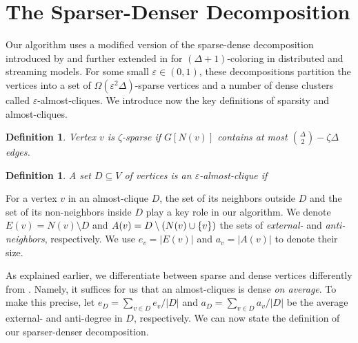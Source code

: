 \documentclass[a4paper,english,11pt]{amsart}
\newtheorem{definition}[lemma]{Definition}
\theoremstyle{definition}
\renewcommand{\leq}{\leqslant}
\renewcommand{\geq}{\geqslant}
\DeclarePairedDelimiter{\set}{\{}{\}}
\newcommand{\eps}{\varepsilon}
\begin{document}
\section{The Sparser-Denser Decomposition}
\label{sec:prelims}

\label{sec:prelims-acd}
Our algorithm uses a modified version of the sparse-dense decomposition introduced by \cite{Reed98} and further extended in \cite{HSS18,ACK19} for $(\Delta+1)$-coloring in distributed and streaming models. For some small $\eps\in(0,1)$, these decompositions partition the vertices into a set of $\Omega(\eps^2 \Delta)$-sparse vertices and a number of dense clusters called $\eps$-almost-cliques.
We introduce now the key definitions of sparsity and almost-cliques.
\begin{definition}
    \label{def:sparsity}
    Vertex $v$ is $\zeta$-sparse if $G[N(v)]$ contains at most $\binom{\Delta}{2} - \zeta\Delta$ edges.
\end{definition}
\begin{definition}
    A set $D \subseteq V$ of vertices is an $\eps$-almost-clique if
\end{definition}

For a vertex $v$ in an almost-clique $D$, the set of its neighbors outside $D$ and the set of its non-neighbors
inside $D$
play a key role in our algorithm. We denote
$E(v) = N(v) \setminus D$ and $A(v) = D \setminus (N(v) \cup \set{v})$ the sets of \emph{external-} and \emph{anti-neighbors}, respectively. We use $e_v = |E(v)|$ and $a_v = |A(v)|$ to denote their size.

As explained earlier, we differentiate between sparse and dense vertices differently from \cite{Reed98,HSS18,ACK19,BRW24}. Namely, it suffices for us that an almost-cliques is dense \emph{on average}.
To make this precise, let $e_D = \sum_{v\in D} e_v/|D|$ and $a_D = \sum_{v\in D} a_v/|D|$ be the average external- and anti-degree in $D$, respectively. We can now state the definition of our sparser-denser decomposition.
\end{document}
